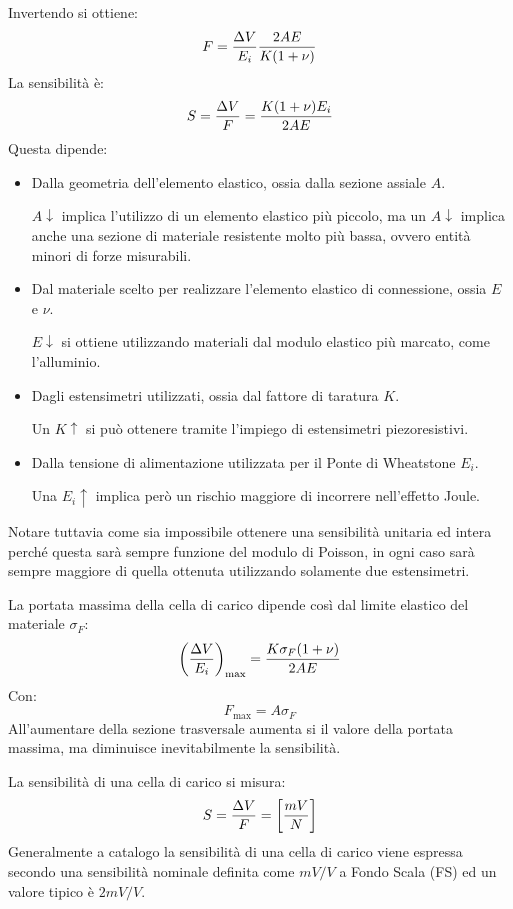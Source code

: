 \documentclass[a4paper, 15pt]{article}
\begin{document}
\begin{adjustwidth}{2in}{}
	 	Invertendo si ottiene: 
	 	\[F = {\Delta V\over E_i}{2 AE\over K(1+\nu)}\]
	 	La sensibilità è:
	 	\[S = {\Delta V\over F} = {K(1+\nu)E_i\over2 AE}\]
	 	Questa dipende:
	 	\begin{itemize}
	 		\item Dalla geometria dell'elemento elastico, ossia dalla sezione assiale $A$.
	 		
	 		$A\downarrow$ implica l'utilizzo di un elemento elastico più piccolo, ma un $A\downarrow$ implica anche una sezione di materiale resistente molto più bassa, ovvero entità minori di forze misurabili. 
	 		
	 		\item Dal materiale scelto per realizzare l'elemento elastico di connessione, ossia $E$ e $\nu$. 
	 		
	 		$E\downarrow$ si ottiene utilizzando materiali dal modulo elastico più marcato, come l'alluminio. 
	
	 		\item Dagli estensimetri utilizzati, ossia dal fattore di taratura $K$. 
	 		
	 		Un $K\uparrow$ si può ottenere tramite l'impiego di estensimetri piezoresistivi. 
	 		
	 		\item Dalla tensione di alimentazione utilizzata per il Ponte di Wheatstone $E_i$. 
	 		
	 		Una $E_i \uparrow$ implica però un rischio maggiore di incorrere nell'effetto Joule. 
	 	\end{itemize} 
 		Notare tuttavia come sia impossibile ottenere una sensibilità unitaria ed intera perché questa sarà sempre funzione del modulo di Poisson, in ogni caso sarà sempre maggiore di quella ottenuta utilizzando solamente due estensimetri. \newline

	 	La portata massima della cella di carico dipende così dal limite elastico del
	 	materiale $\sigma_F$: 
	 	\[\left(\Delta V\over E_i \right)_{\text{max}}= {K\sigma_F(1+\nu)\over2 AE}\] 
	 	Con: 
	 	\[F_{\text{max}} = A\sigma_F\]
	 	All'aumentare della sezione trasversale aumenta si il valore della portata massima, ma diminuisce inevitabilmente la sensibilità. \newline 
	 	
	 	La sensibilità di una cella di carico si misura:
	 	\[S = {\Delta V\over F} = \left[mV\over N\right]\] 
	 	Generalmente a catalogo la sensibilità di una cella di carico viene espressa secondo una sensibilità nominale definita come $ mV/V $ a Fondo Scala (FS) ed
	 	un valore tipico è $ 2mV/V $.\newline 
	 	

\end{adjustwidth}
\end{document}
